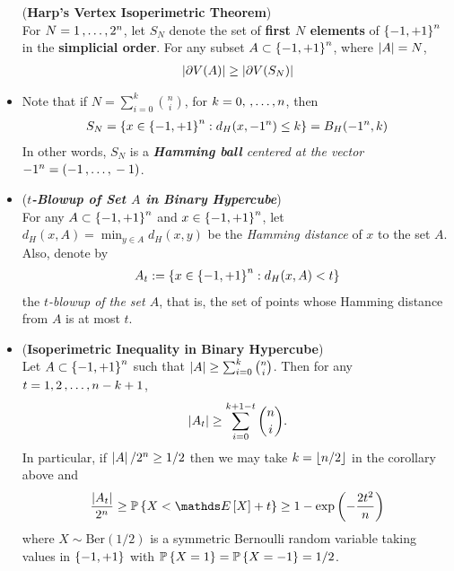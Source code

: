 \documentclass[11pt]{article}
\begin{document}
\begin{itemize}
\begin{theorem} (\textbf{Harp's Vertex Isoperimetric Theorem}) \citep{boucheron2013concentration}\\
For $N = 1 \,{,}\ldots{,}\, 2^n$, let $S_N$ denote the set of \textbf{first $N$ elements} of $\left\{-1, +1\right\}^n$ in the \textbf{simplicial order}. For any subset $A \subset \left\{-1, +1\right\}^n$, where $\left\lvert A \right\rvert = N$, 
\begin{align*}
\left\lvert \partial V(A) \right\rvert \ge \left\lvert \partial V(S_N) \right\rvert 
\end{align*}
\end{theorem}

\item \begin{remark}
Note that if $N = \sum_{i=0}^{k}{n \choose i}$, for $k=0, \,{,}\ldots{,}\, n$, then 
\begin{align*}
S_N = \left\{x \in \left\{-1, +1\right\}^n:  d_{H}(x, -1^n) \le k\right\} = B_{H}(-1^n, k)
\end{align*} In other words, $S_N$ is a \emph{\textbf{Hamming ball} centered at the vector $-1^n= (-1 \,{,}\ldots{,}\, -1)$}.
\end{remark}

\item \begin{definition} (\textbf{\emph{$t$-Blowup of Set $A$ in Binary Hypercube}}) \\
For any $A \subset \left\{-1, +1\right\}^n$ and $x \in \left\{-1, +1\right\}^n$, let $d_{H}(x, A) = \min_{y \in A} d_{H}(x, y)$ be the \emph{Hamming distance} of $x$ to the set $A$. Also, denote by
\begin{align*}
A_t := \left\{x \in \left\{-1, +1\right\}^n: d_{H}(x, A) < t\right\}
\end{align*} the \emph{$t$-blowup of the set $A$}, that is, the set of points whose Hamming distance from $A$ is at most $t$.
\end{definition}

\item \begin{corollary} (\textbf{Isoperimetric Inequality in Binary Hypercube}) \citep{boucheron2013concentration}\\ 
Let $A \subset \left\{-1, +1\right\}^n$ such that $\left\lvert A \right\rvert \ge \sum_{i=0}^{k}{n \choose i}$. Then for any $t=1, 2 \,{,}\ldots{,}\, n-k+1$, 
\begin{align}
\left\lvert A_t \right\rvert \ge  \sum_{i=0}^{k+1 - t}{n \choose i}. \label{ineqn: harp_vertex_isoperimetric_inequality}
\end{align} In particular, if $\left\lvert A \right\rvert/2^n \ge 1/2$ then we may take $k = \left\lfloor n/2 \right\rfloor$ in the corollary above and
\begin{align}
\frac{\abs{A_t}}{2^n} \ge \bP\set{X  < \E{}{X} + t } \ge 1 - \exp\paren{- \frac{2t^2}{n}}
\end{align} where $X \sim \text{Ber}(1/2)$ is a symmetric Bernoulli random variable taking values in $\left\{-1, +1\right\}$ with ${\mathbb P}\left\{X= 1\right\} = {\mathbb P}\left\{X = -1\right\} = 1/2$.
\end{corollary}


\end{itemize}
\end{document}
